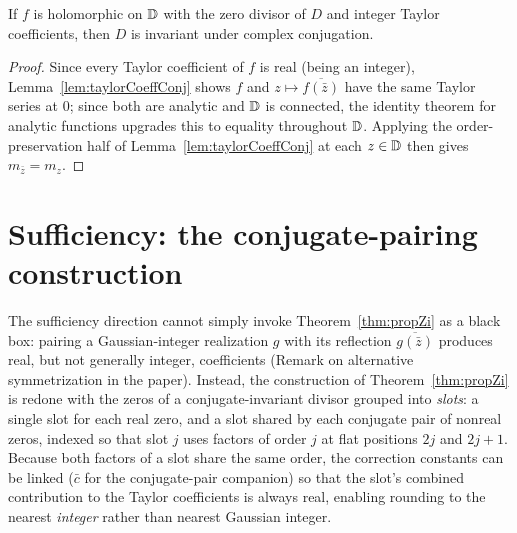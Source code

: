 \begin{lemma}
  \label{lem:necessity}
  \leanok
  If $f$ is holomorphic on $\mathbb{D}$ with the zero divisor of $D$ and integer
  Taylor coefficients, then $D$ is invariant under complex conjugation.
\end{lemma}
\begin{proof}
  \leanok
  Since every Taylor coefficient of $f$ is real (being an integer),
  Lemma~\ref{lem:taylorCoeffConj} shows $f$ and $z \mapsto
  \overline{f(\bar z)}$ have the same Taylor series at $0$; since both
  are analytic and $\mathbb{D}$ is connected, the identity theorem for analytic
  functions upgrades this to equality throughout $\mathbb{D}$. Applying the
  order-preservation half of Lemma~\ref{lem:taylorCoeffConj} at each
  $z \in \mathbb{D}$ then gives $m_{\bar z} = m_z$.
\end{proof}

\section{Sufficiency: the conjugate-pairing construction}

The sufficiency direction cannot simply invoke
Theorem~\ref{thm:propZi} as a black box: pairing a Gaussian-integer
realization $g$ with its reflection $\overline{g(\bar z)}$ produces real,
but not generally integer, coefficients (Remark on alternative
symmetrization in the paper). Instead, the construction of
Theorem~\ref{thm:propZi} is redone with the zeros of a conjugate-invariant
divisor grouped into \emph{slots}: a single slot for each real zero, and a
slot shared by each conjugate pair of nonreal zeros, indexed so that slot
$j$ uses factors of order $j$ at flat positions $2j$ and $2j+1$. Because
both factors of a slot share the same order, the correction constants
can be linked ($\bar c$ for the conjugate-pair companion) so that the
slot's combined contribution to the Taylor coefficients is always real,
enabling rounding to the nearest \emph{integer} rather than nearest
Gaussian integer.

